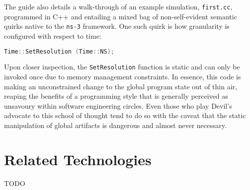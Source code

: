 The guide also details a walk-through of an example simulation, \texttt{first.cc}, programmed in C++ and entailing a
mixed bag of non-self-evident semantic quirks native to the \texttt{ns-3} framework. One such quirk is how
granularity is configured with respect to time:

\begin{lstlisting}[language=C++]
    Time::SetResolution (Time::NS);
\end{lstlisting}

Upon closer inspection, the \texttt{SetResolution} function is static and can only be invoked once due to memory
management constraints. In essence, this code is making an unconstrained change to the global program state out of thin
air, reaping the benefits of a programming style that is generally perceived as unsavoury within software engineering
circles\cite{stack_exchange_static_methods, git_connected_static_methods, medium_static_methods,
    tom_butler_static_methods}. Even those who play Devil's advocate to this school of thought tend to do so with the
caveat that the static manipulation of global artifacts is dangerous and almost never
necessary\cite{java_code_geeks_static_methods}.


\section{Related Technologies}

TODO
